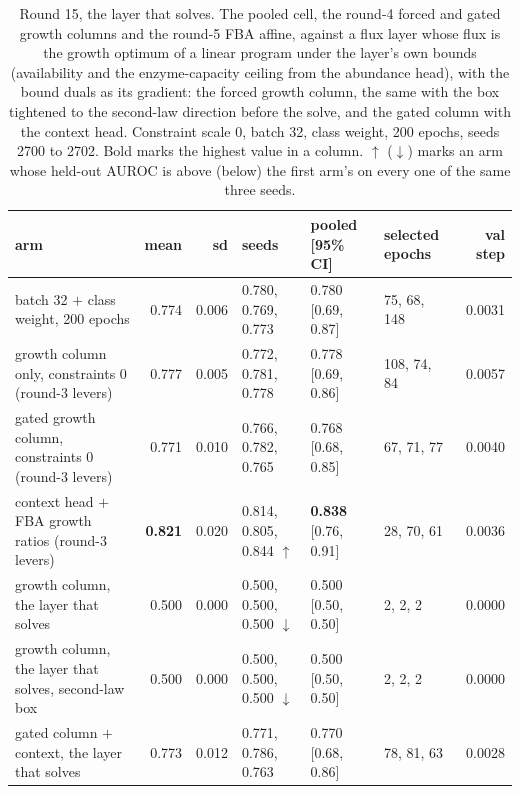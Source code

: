 \begin{table}[H]
  \centering
  \footnotesize
  \setlength{\tabcolsep}{3pt}
  \caption[Round 15, the layer that solves]{Round 15, the layer that solves. The pooled cell, the round-4 forced and gated growth columns and the round-5 FBA affine, against a flux layer whose flux is the growth optimum of a linear program under the layer's own bounds (availability and the enzyme-capacity ceiling from the abundance head), with the bound duals as its gradient: the forced growth column, the same with the box tightened to the second-law direction before the solve, and the gated column with the context head. Constraint scale 0, batch 32, class weight, 200 epochs, seeds 2700 to 2702. Bold marks the highest value in a column. $\uparrow$ ($\downarrow$) marks an arm whose held-out AUROC is above (below) the first arm's on every one of the same three seeds.}
  \label{tab:w26}
  \begin{tabular}{@{}lrrlllr@{}}
    \hline
    arm & mean & sd & seeds & pooled [95\% CI] & selected epochs & val step \\
    \hline
    batch 32 $+$ class weight, 200 epochs & 0.774 & 0.006 & 0.780, 0.769, 0.773 & 0.780 [0.69, 0.87] & 75, 68, 148 & 0.0031 \\
    growth column only, constraints 0 (round-3 levers) & 0.777 & 0.005 & 0.772, 0.781, 0.778 & 0.778 [0.69, 0.86] & 108, 74, 84 & 0.0057 \\
    gated growth column, constraints 0 (round-3 levers) & 0.771 & 0.010 & 0.766, 0.782, 0.765 & 0.768 [0.68, 0.85] & 67, 71, 77 & 0.0040 \\
    context head $+$ FBA growth ratios (round-3 levers) & \textbf{0.821} & 0.020 & 0.814, 0.805, 0.844 $\uparrow$ & \textbf{0.838} [0.76, 0.91] & 28, 70, 61 & 0.0036 \\
    growth column, the layer that solves & 0.500 & 0.000 & 0.500, 0.500, 0.500 $\downarrow$ & 0.500 [0.50, 0.50] & 2, 2, 2 & 0.0000 \\
    growth column, the layer that solves, second-law box & 0.500 & 0.000 & 0.500, 0.500, 0.500 $\downarrow$ & 0.500 [0.50, 0.50] & 2, 2, 2 & 0.0000 \\
    gated column $+$ context, the layer that solves & 0.773 & 0.012 & 0.771, 0.786, 0.763 & 0.770 [0.68, 0.86] & 78, 81, 63 & 0.0028 \\
    \hline
  \end{tabular}
\end{table}
